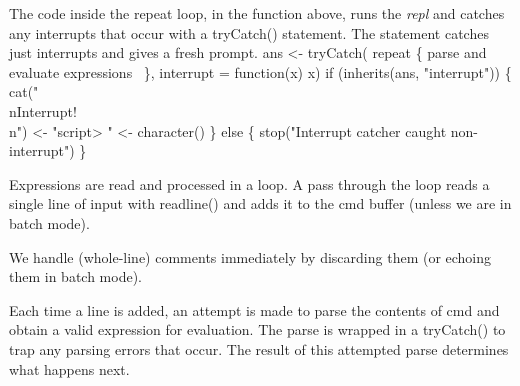 \documentclass[a4paper]{article}%
\begin{document}
\eatline
{}\nwendcode{}\nwdocspar
The code inside the {\Tt{}repeat\nwendquote} loop, in the function above, runs
the \emph{repl} and catches any interrupts that occur with a
{\Tt{}tryCatch()\nwendquote} statement.  The statement catches just interrupts and
gives a fresh prompt.
\nwenddocs{}\endmoddef\nwstartdeflinemarkup{}\nwenddeflinemarkup
ans <- tryCatch(
    repeat \{
        \LA{}parse and evaluate expressions~{\nwtagstyle{}}\RA{}
    \}, interrupt = function(x) x)
if (inherits(ans, "interrupt")) \{
    cat("\\nInterrupt!\\n")
     <- "script> "
     <- character()
\} else \{
    stop("Interrupt catcher caught non-interrupt")
\}
\nwendcode{}\nwdocspar

Expressions are read and processed in a loop. A pass through the loop
reads a single line of input with {\Tt{}readline()\nwendquote} and adds it to the
{\Tt{}cmd\nwendquote} buffer (unless we are in batch mode).  

We handle (whole-line) comments immediately by discarding them
(or echoing them in batch mode).

Each time a line is added, an attempt is made to
parse the contents of {\Tt{}cmd\nwendquote} and obtain a valid expression for
evaluation. The parse is wrapped in a {\Tt{}tryCatch()\nwendquote} to trap any
parsing errors that occur.  The result of this attempted parse
determines what happens next.
\end{document}
